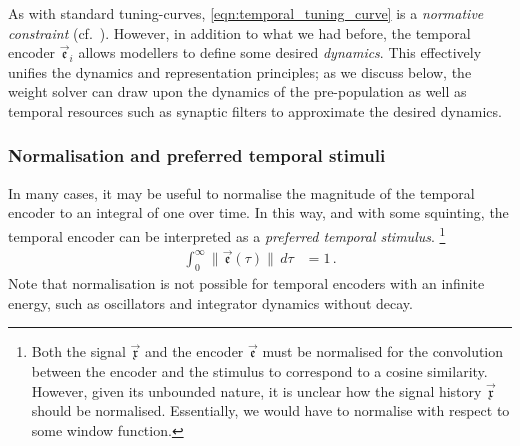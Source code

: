 As with standard tuning-curves, \cref{eqn:temporal_tuning_curve} is a \emph{normative constraint} (cf.~).
However, in addition to what we had before, the temporal encoder $\vec{\mathfrak{e}}_i$ allows modellers to define some desired \emph{dynamics}.
This effectively unifies the \NEF dynamics and representation principles; as we discuss below, the weight solver can draw upon the dynamics of the pre-population as well as temporal resources such as synaptic filters to approximate the desired dynamics.

\subsubsection{Normalisation and preferred temporal stimuli}
In many cases, it may be useful to normalise the magnitude of the temporal encoder to an integral of one over time.
In this way, and with some squinting, the temporal encoder can be interpreted as a \emph{preferred temporal stimulus}.%
\footnote{Both the signal $\vec{\mathfrak{x}}$ and the encoder $\vec{\mathfrak{e}}$ must be normalised for the convolution between the encoder and the stimulus to correspond to a cosine similarity.
However, given its unbounded nature, it is unclear how the signal history $\vec{\mathfrak{x}}$ should be normalised.
Essentially, we would have to normalise with respect to some window function.}
\begin{align}
	\int_{0}^\infty \| \vec{\mathfrak{e}}(\tau) \| \,\mathit{d\tau}&= 1 \,.
	\label{eqn:normalisation}
\end{align}
Note that normalisation is not possible for temporal encoders with an infinite energy, such as oscillators and integrator dynamics without decay.

